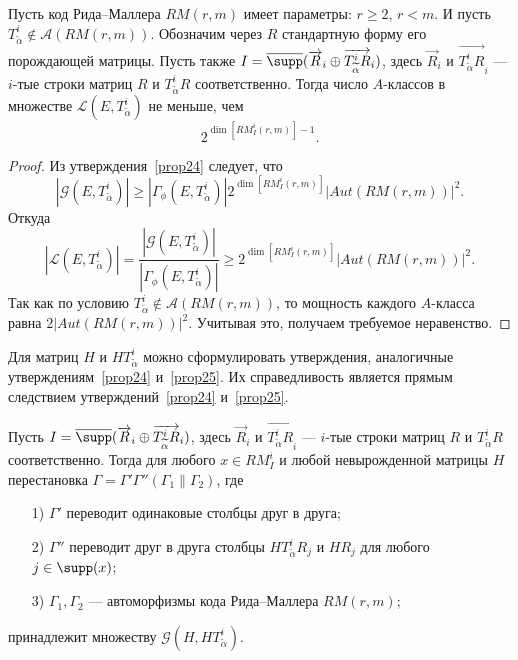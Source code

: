 \begin{proposition}\label{prop25}
Пусть код Рида--Маллера $RM(r,m)$ имеет параметры: $r\geqslant 2$,
$r<m$.  И пусть $T^i_{\widetilde\alpha}\not\in \mathcal
A(RM(r,m)).$ Обозначим через $R$ стандартную форму его порождающей
матрицы. Пусть также
$I=\overline{\supp}(\overrightarrow{R}_i\oplus\overrightarrow{T^i_{\widetilde\alpha}R}_i)$,
здесь $\overrightarrow{R}_i$ и
$\overrightarrow{T^i_{\widetilde\alpha}R}_i$ --- $i$-тые строки
матриц $R$ и $T^i_{\widetilde\alpha}R$ соответственно. Тогда число
$A$-классов в множестве $\mathcal L(E,T^i_{\tilde\alpha})$ не
меньше, чем
$$
2^{\dim \left[RM^i_I(r,m)\right]-1}.
$$
\end{proposition}
\begin{proof}
Из утверждения~\ref{prop24} следует, что
$$
|\mathcal G(E,T^i_{\widetilde\alpha})|\geqslant|\Gamma_{\phi}(E,T^i_{\widetilde\alpha})|2^{\dim
\left[RM^i_I(r,m)\right]}|Aut(RM(r,m))|^2.
$$
Откуда
$$
|\mathcal L(E,T^i_{\widetilde\alpha})|=\frac{|\mathcal
G(E,T^i_{\widetilde\alpha})|}{|\Gamma_{\phi}(E,T^i_{\widetilde\alpha})|}\geqslant
2^{\dim \left[RM^i_I(r,m)\right]}|Aut(RM(r,m))|^2.
$$
Так как по условию $T^i_{\widetilde\alpha}\not\in \mathcal
A(RM(r,m))$, то мощность каждого $A$-класса\\ равна
$2|Aut(RM(r,m))|^2$. Учитывая это, получаем требуемое неравенство.
\end{proof}

Для матриц $H$ и $HT^i_{\widetilde\alpha}$  можно сформулировать
утверждения, аналогичные утверждениям~\ref{prop24} и~\ref{prop25}.
Их справедливость является прямым следствием
утверждений~\ref{prop24} и~\ref{prop25}.

\begin{proposition}\label{prop26}
Пусть
$I=\overline{\supp}(\overrightarrow{R}_i\oplus\overrightarrow{T^i_{\widetilde\alpha}R}_i)$,
здесь $\overrightarrow{R}_i$ и
$\overrightarrow{T^i_{\widetilde\alpha}R}_i$ --- $i$-тые строки
матриц $R$ и $T^i_{\widetilde\alpha}R$ соответственно. Тогда для
любого $x\in RM^i_I$  и любой невырожденной матрицы $H$
перестановка $\Gamma=\Gamma'\Gamma''(\Gamma_1\|\Gamma_2)$, где
\begin{itemize}
\item[1)] $\Gamma'$ переводит одинаковые столбцы друг в друга;
\item[2)] $\Gamma''$ переводит друг в друга  столбцы $HT^i_{\widetilde\alpha}R_j$
 и $HR_j$ для любого $j\in \supp(x)$;
 \item[3)] $\Gamma_1,\Gamma_2$ --- автоморфизмы кода Рида--Маллера
 $RM(r,m)$;
\end{itemize}
принадлежит множеству $\mathcal G(H,HT^i_{\widetilde\alpha})$.
\end{proposition}


